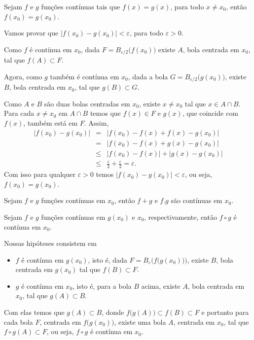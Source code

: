 \documentclass[11pt, oneside, a4paper]{gsm-l}
\begin{document}
\begin{teo}
  Sejam $f$ e $g$ funções contínuas tais que $f(x)=g(x)$, para todo $x
  \ne x_0$, então $f(x_0)=g(x_0)$.
\end{teo}

\begin{dem}
  Vamos provar que $\big|f(x_0)-g(x_0)\big|<\varepsilon$, para todo
  $\varepsilon>0$.

  Como $f$ é contínua em $x_0$, dada $F=B_{\varepsilon\slash
    2}\big(f(x_0)\big)$ existe $A$, bola centrada em $x_0$, tal que
  $f(A)\subset F$.

  Agora, como $g$ também é contínua em $x_0$, dada a bola
  $G=B_{\varepsilon\slash 2}\big(g(x_0)\big)$, existe $B$, bola
  centrada em $x_0$, tal que $g(B)\subset G$.

  Como $A$ e $B$ são duas bolas centradas em $x_0$, existe $x\ne x_0$
  tal que $x\in A \cap B$. Para cada $x\ne x_0$ em $A\cap B$ temos que
  $f(x)\in F$ e $g(x)$, que coincide com $f(x)$, também está em
  $F$. Assim,
  \begin{eqnarray*}
    \big|f(x_0)-g(x_0)\big|&=&\big|f(x_0)-f(x)+f(x)-g(x_0)\big|\\
    &=&\big|f(x_0)-f(x)+g(x)-g(x_0)\big|\\
    &\leq&\big|f(x_0)-f(x)\big|+\big|g(x)-g(x_0)\big|\\
    &\leq&\frac{\varepsilon}{2} + \frac{\varepsilon}{2}=\varepsilon.
  \end{eqnarray*}
  Com isso para qualquer $\varepsilon>0$ temos
  $\big|f(x_0)-g(x_0)\big|<\varepsilon$, ou seja, $f(x_0)=g(x_0)$.
\end{dem}

\begin{teo}
  Sejam $f$ e $g$ funções contínuas em $x_0$, então $f+g$ e $f.g$ são
  contínuas em $x_0$.
\end{teo}

\begin{dem}
\end{dem}

\begin{teo}
  Sejam $f$ e $g$ funções contínuas em $g(x_0)$ e $x_0$,
  respectivamente, então $f \circ g$ é contínua em $x_0$.
\end{teo}

\begin{dem}
  Nossas hipóteses consistem em
  \begin{itemize}
    \item $f$ é contínua em $g\left( {x_0 } \right)$, isto é, dada
    $F=B_\varepsilon\Big(f\big(g(x_0)\big)\Big)$, existe $B$, bola
    centrada em $g(x_0)$ tal que $f(B)\subset F$.
    \item $g$ é contínua em $x_0 $, isto é, para a bola $B$ acima,
    existe $A$, bola centrada em $x_0$, tal que $g(A)\subset B$.
  \end{itemize}

  Com elas temos que $g(A)\subset B$, donde $f\big(g(A)\big)\subset
  f(B)\subset F$ e portanto para cada bola $F$, centrada em
  $f\big(g(x_0)\big)$, existe uma bola $A$, centrada em $x_0$, tal que
  $f\circ g(A)\subset F$, ou seja, $f\circ g$ é contínua em $x_0$.
\end{dem}
\end{document}
